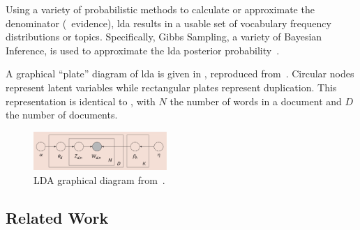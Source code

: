 
\noindent
Using a variety of probabilistic methods to calculate or approximate the denominator (\ie\ evidence), \ac{lda} results in a usable set of vocabulary frequency distributions or topics.
Specifically, Gibbs Sampling, a variety of Bayesian Inference, is used to approximate the \ac{lda} posterior probability~\cite{Blei2003}.


A graphical ``plate'' diagram of \ac{lda} is given in , reproduced from~\cite{Blei2003}.
Circular nodes represent latent variables while rectangular plates represent duplication.
This representation is identical to , with $N$ the number of words in a document and $D$ the number of documents.


\begin{figure}
  \includegraphics[width=0.45\textwidth]{figures/lda-plates}
  \caption{LDA graphical diagram from~\cite{Blei2012}\label{fig:lda-plates}.}
\end{figure}


\subsection{Related Work}
\label{sec:related-work}


